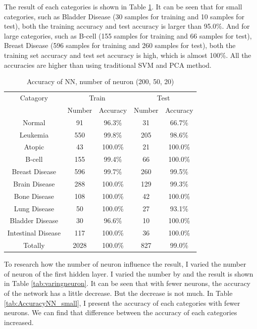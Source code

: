\documentclass[sigchi]{acmart}
\begin{document}
The result of each categories is shown in Table \ref{tab:AccuracyNN}. It can be seen that for small categories, such as Bladder Disease
(30 samples for training and 10 samples for test), both the training accuracy and test accuracy is larger than 95.0\%. And for large categories, such as B-cell (155 samples for training and 66 samples for test), Breast Disease (596 samples for training and 260 samples for test), both the training set accuracy and test set accuracy is high, which is almost 100\%. All the accuracies are higher than using traditional SVM and PCA method.
\begin{table}
  \caption{Accuracy of NN, number of neuron (200, 50, 20)}
  \label{tab:AccuracyNN}
  \begin{tabular}{ccccc}
    \toprule
    Catagory & \multicolumn{2}{c}{Train} & \multicolumn{2}{c}{Test}\\
    & Number & Accuracy & Number & Accuracy\\
    \midrule
    Normal & 91 & 96.3\% & 31 & 66.7\% \\
    Leukemia & 550 & 99.8\% & 205 & 98.6\% \\
    Atopic & 43 & 100.0\% & 21 & 100.0\% \\
    B-cell & 155 & 99.4\% & 66 & 100.0\% \\
    Breast Disease &  596 & 99.7\% & 260 & 99.5\% \\
    Brain Disease & 288 & 100.0\% & 129 & 99.3\% \\
    Bone Disease & 108 & 100.0\% & 42 & 100.0\% \\
    Lung Disease & 50 & 100.0\% & 27 & 93.1\% \\
    Bladder Disease & 30 & 96.6\% & 10 & 100.0\% \\
    Intestinal Disease & 117 & 100.0\% & 36 & 100.0\% \\
    \midrule
    Totally & 2028 & 100.0\% & 827 & 99.0\% \\
    \bottomrule
  \end{tabular}
\end{table}

To research how the number of neuron influence the result, I varied the number of neuron of the first hidden layer. I varied the number by and the result is shown in Table \ref{tab:varingneuron}. It can be seen that with fewer neurons, the accuracy of the network has a little decrease. But the decrease is not much. In Table \ref{tab:AccuracyNN_small}, I present the accuracy of each categories with fewer neurons. We can find that difference between the accuracy of each categories increased.
\end{document}
